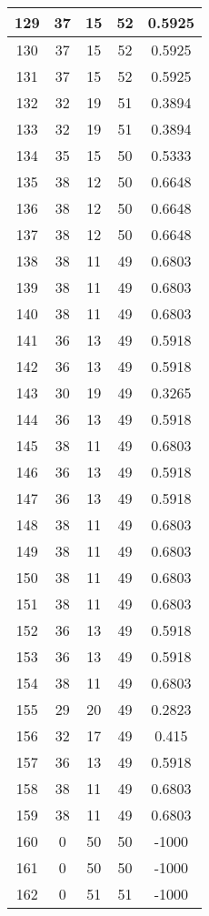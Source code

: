 \documentclass[letterpaper, 12pt]{article}
\begin{document}
\begin{longtable}{|c|c|c|c|c|}
\hline
129 & 37 & 15 & 52 & 0.5925 \\
\hline
130 & 37 & 15 & 52 & 0.5925 \\
\hline
131 & 37 & 15 & 52 & 0.5925 \\
\hline
132 & 32 & 19 & 51 & 0.3894 \\
\hline
133 & 32 & 19 & 51 & 0.3894 \\
\hline
134 & 35 & 15 & 50 & 0.5333 \\
\hline
135 & 38 & 12 & 50 & 0.6648 \\
\hline
136 & 38 & 12 & 50 & 0.6648 \\
\hline
137 & 38 & 12 & 50 & 0.6648 \\
\hline
138 & 38 & 11 & 49 & 0.6803 \\
\hline
139 & 38 & 11 & 49 & 0.6803 \\
\hline
140 & 38 & 11 & 49 & 0.6803 \\
\hline
141 & 36 & 13 & 49 & 0.5918 \\
\hline
142 & 36 & 13 & 49 & 0.5918 \\
\hline
143 & 30 & 19 & 49 & 0.3265 \\
\hline
144 & 36 & 13 & 49 & 0.5918 \\
\hline
145 & 38 & 11 & 49 & 0.6803 \\
\hline
146 & 36 & 13 & 49 & 0.5918 \\
\hline
147 & 36 & 13 & 49 & 0.5918 \\
\hline
148 & 38 & 11 & 49 & 0.6803 \\
\hline
149 & 38 & 11 & 49 & 0.6803 \\
\hline
150 & 38 & 11 & 49 & 0.6803 \\
\hline
151 & 38 & 11 & 49 & 0.6803 \\
\hline
152 & 36 & 13 & 49 & 0.5918 \\
\hline
153 & 36 & 13 & 49 & 0.5918 \\
\hline
154 & 38 & 11 & 49 & 0.6803 \\
\hline
155 & 29 & 20 & 49 & 0.2823 \\
\hline
156 & 32 & 17 & 49 & 0.415 \\
\hline
157 & 36 & 13 & 49 & 0.5918 \\
\hline
158 & 38 & 11 & 49 & 0.6803 \\
\hline
159 & 38 & 11 & 49 & 0.6803 \\
\hline
160 & 0 & 50 & 50 & -1000 \\
\hline
161 & 0 & 50 & 50 & -1000 \\
\hline
162 & 0 & 51 & 51 & -1000 \\

\end{longtable}
\end{document}
